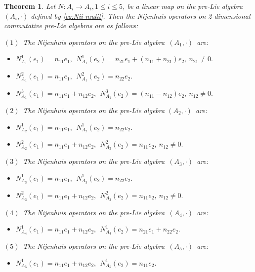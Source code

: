 \documentclass[10pt,a4paper]{amsart}
\newtheorem{theorem}{Theorem}
\begin{document}
\begin{theorem}\label{Ni ope on 2 c}
Let $N:A_i\rightarrow A_i,1\leq i\leq 5$, be a linear map on the pre-Lie algebra $(A_i, \cdot)$ defined by \eqref{eq:Nii-mulit}. Then the Nijenhuis operators on 2-dimensional commutative pre-Lie algebras are as follows:

$(1)$~The Nijenhuis operators on the pre-Lie algebra~$(A_{1},\cdot)$~are:
\begin{itemize}
   \item[] $N_{A_{1}}^1(e_1)= n_{11}e_1,~~ N_{A_{1}}^1(e_2)= n_{21}e_1+(n_{11}+n_{21})e_2,~n_{21}\neq0.$
   \item[] $N_{A_{1}}^2(e_1)= n_{11}e_1,~~ N_{A_{1}}^2(e_2)= n_{22}e_2.$
   \item[]  $N_{A_{1}}^3(e_1)=n_{11}e_1+ n_{12}e_2 ,~~ N_{A_{1}}^3(e_2)= (n_{11}-n_{12})e_2,~n_{12}\neq0.$
   \end{itemize}

$(2)$~The Nijenhuis operators on the pre-Lie algebra $(A_{2},\cdot)$~are:
\begin{itemize}
   \item[] $N_{A_{2}}^1(e_1)= n_{11}e_1,~~ N_{A_{2}}^1(e_2)= n_{22}e_2.$
   \item[]  $N_{A_{2}}^2(e_1)=n_{11}e_1+ n_{12}e_2 ,~~ N_{A_{2}}^2(e_2)= n_{11}e_2,~n_{12}\neq0.$
   \end{itemize}

$(3)$~The Nijenhuis operators on the pre-Lie algebra~$(A_{3},\cdot)$~are:
\begin{itemize}
   \item[] $N_{A_{3}}^1(e_1)= n_{11}e_1,~~ N_{A_{3}}^1(e_2)= n_{22}e_2.$
   \item[]  $N_{A_{3}}^2(e_1)=n_{11}e_1+ n_{12}e_2 ,~~ N_{A_{3}}^2(e_2)= n_{11}e_2,~n_{12}\neq0.$
   \end{itemize}

$(4)$~The Nijenhuis operators on the pre-Lie algebra~$(A_{4},\cdot)$~are:
\begin{itemize}
   \item[] $N_{A_{4}}^1(e_1)= n_{11}e_1+n_{12}e_2,~~ N_{A_{4}}^1(e_2)= n_{21}e_1+n_{22}e_2.$
   \end{itemize}

$(5)$~The Nijenhuis operators on the pre-Lie algebra~$(A_{5},\cdot)$~are:
\begin{itemize}
   \item[]  $N_{A_{5}}^1(e_1)=n_{11}e_1+ n_{12}e_2 ,~~ N_{A_{5}}^1(e_2)= n_{11}e_2.$
   \end{itemize}
\end{theorem}
\end{document}
